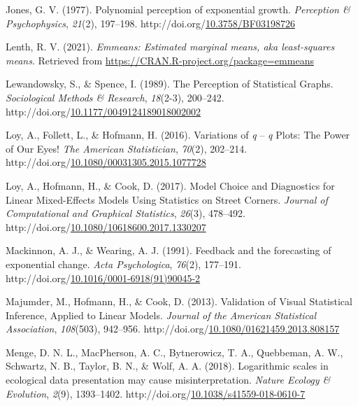 \documentclass[print]{nuthesis}
\newlength{\cslhangindent}
\newenvironment{CSLReferences}%
{\setlength{\parindent}{0pt}%
\everypar{\setlength{\hangindent}{\cslhangindent}}\ignorespaces}%
{\par}
\begin{document}
\begin{CSLReferences}{1}{0}
\leavevmode\hypertarget{ref-jones_polynomial_1977}{}%
Jones, G. V. (1977). Polynomial perception of exponential growth. \emph{Perception \& Psychophysics}, \emph{21}(2), 197--198. http://doi.org/\href{https://doi.org/10.3758/BF03198726}{10.3758/BF03198726}

\leavevmode\hypertarget{ref-emmeans}{}%
Lenth, R. V. (2021). \emph{Emmeans: Estimated marginal means, aka least-squares means}. Retrieved from \url{https://CRAN.R-project.org/package=emmeans}

\leavevmode\hypertarget{ref-lewandowsky_perception_1989}{}%
Lewandowsky, S., \& Spence, I. (1989). The {Perception} of {Statistical} {Graphs}. \emph{Sociological Methods \& Research}, \emph{18}(2-3), 200--242. http://doi.org/\href{https://doi.org/10.1177/0049124189018002002}{10.1177/0049124189018002002}

\leavevmode\hypertarget{ref-loy_variations_2016}{}%
Loy, A., Follett, L., \& Hofmann, H. (2016). Variations of \emph{q} -- \emph{q} {Plots}: {The} {Power} of {Our} {Eyes}! \emph{The American Statistician}, \emph{70}(2), 202--214. http://doi.org/\href{https://doi.org/10.1080/00031305.2015.1077728}{10.1080/00031305.2015.1077728}

\leavevmode\hypertarget{ref-loy_model_2017}{}%
Loy, A., Hofmann, H., \& Cook, D. (2017). Model {Choice} and {Diagnostics} for {Linear} {Mixed}-{Effects} {Models} {Using} {Statistics} on {Street} {Corners}. \emph{Journal of Computational and Graphical Statistics}, \emph{26}(3), 478--492. http://doi.org/\href{https://doi.org/10.1080/10618600.2017.1330207}{10.1080/10618600.2017.1330207}

\leavevmode\hypertarget{ref-mackinnon_feedback_1991}{}%
Mackinnon, A. J., \& Wearing, A. J. (1991). Feedback and the forecasting of exponential change. \emph{Acta Psychologica}, \emph{76}(2), 177--191. http://doi.org/\href{https://doi.org/10.1016/0001-6918(91)90045-2}{10.1016/0001-6918(91)90045-2}

\leavevmode\hypertarget{ref-majumder_validation_2013}{}%
Majumder, M., Hofmann, H., \& Cook, D. (2013). Validation of {Visual} {Statistical} {Inference}, {Applied} to {Linear} {Models}. \emph{Journal of the American Statistical Association}, \emph{108}(503), 942--956. http://doi.org/\href{https://doi.org/10.1080/01621459.2013.808157}{10.1080/01621459.2013.808157}

\leavevmode\hypertarget{ref-menge_logarithmic_2018}{}%
Menge, D. N. L., MacPherson, A. C., Bytnerowicz, T. A., Quebbeman, A. W., Schwartz, N. B., Taylor, B. N., \& Wolf, A. A. (2018). Logarithmic scales in ecological data presentation may cause misinterpretation. \emph{Nature Ecology \& Evolution}, \emph{2}(9), 1393--1402. http://doi.org/\href{https://doi.org/10.1038/s41559-018-0610-7}{10.1038/s41559-018-0610-7}


\end{CSLReferences}
\end{document}
